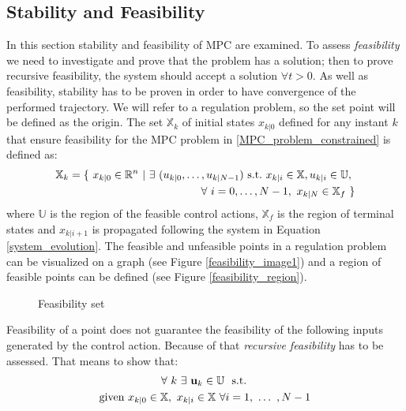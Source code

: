 \subsection{Stability and Feasibility}
In this section stability and feasibility of MPC are examined. To assess \textit{feasibility} we need to investigate and prove that the problem has a solution; then to prove recursive feasibility, the system should accept a solution $\forall t>0$. As well as feasibility, stability has to be proven in order to have convergence of the performed trajectory. We will refer to a regulation problem, so the set point will be defined as the origin.
The set $\mathbb{X}_{k}$ of initial states $x_{k|0}$ defined for any instant $k$ that ensure feasibility for the MPC problem in \eqref{MPC_problem_constrained} is defined as:
\begin{equation}
	\begin{split}
		\mathbb{X}_{k}=\lbrace\ x_{k|0}\in\mathbb{R}^n\ |\ \exists\  (u_{k|0}, \dots , u_{k|N-1})\ \textnormal{s.t.}\ x_{k|i} \in \mathbb{X}, u_{k|i} \in \mathbb{U},\ &  \\ 
		\forall\  i=0,\dots,N-1,\ x_{k|N} \in \mathbb{X}_f\ \rbrace& \\ 
	\end{split}
	\label{feasibility}
\end{equation}
where $\mathbb{U}$ is the region of the feasible control actions, $\mathbb{X}_f$ is the region of terminal states and $x_{k|i+1}$ is propagated following the system in Equation \eqref{system_evolution}. The feasible and unfeasible points in a regulation problem can be visualized on a graph (see Figure \ref{feasibility_image1}) and a region of feasible points can be defined (see Figure \ref{feasibility_region}).
\begin{figure}%
\centering
{}%
\qquad
{}%
\caption{Feasibility set}
\end{figure}
Feasibility of a point does not guarantee the feasibility of the following inputs generated by the control action. Because of that \textit{recursive feasibility} has to be assessed. That means to show that:
\begin{equation}
\begin{split} 
&\ \ \ \ \ \ \ \ \ \forall\ k\ \exists\  \textbf{u}_k\in \mathbb{U}\ \  \textnormal{s.t. } \\ 
\textnormal{given } &x_{k|0} \in \mathbb{X}, \  x_{k|i} \in \mathbb{X}\  \forall i = 1,\  \dots\ , N-1   
\end{split}
\label{def_rec_feas}
\end{equation}
